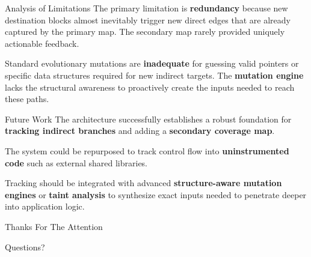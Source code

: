 \documentclass[aspectratio=169]{beamer}
\begin{document}
  \begin{frame}{Analysis of Limitations}
    The primary limitation is \textbf{redundancy} because new destination blocks almost inevitably trigger new direct edges that are already captured by the primary map. The secondary map rarely provided uniquely actionable feedback.

    Standard evolutionary mutations are \textbf{inadequate} for guessing valid pointers or specific data structures required for new indirect targets. The \textbf{mutation engine} lacks the structural awareness to proactively create the inputs needed to reach these paths.
  \end{frame}

  \begin{frame}{Future Work}
    The architecture successfully establishes a robust foundation for \textbf{tracking indirect branches} and adding a \textbf{secondary coverage map}.

    The system could be repurposed to track control flow into \textbf{uninstrumented code} such as external shared libraries.

    Tracking should be integrated with advanced \textbf{structure-aware mutation engines} or \textbf{taint analysis} to synthesize exact inputs needed to penetrate deeper into application logic.
  \end{frame}

  \begin{frame}[standout]
    Thanks For The Attention

    \vspace{0.8em}
    \normalsize
    Questions?
  \end{frame}
\end{document}
